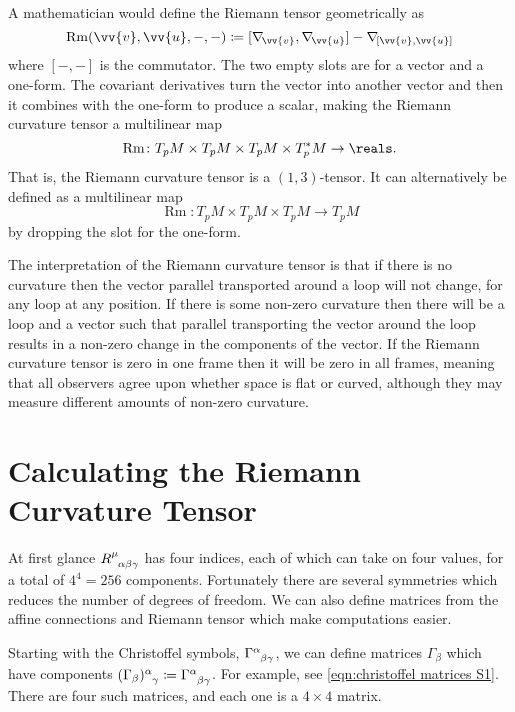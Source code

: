 \documentclass[fleqn]{NotesClass}
\newcommand*{\christoffel}[3]{\tensor{\Gamma}{^{#1}_{{#2}{#3}}}}
\newcommand*{\covariantDerivative}[1]{\nabla_{\!#1}}
\begin{document}
    A mathematician would define the Riemann tensor geometrically as
    \begin{equation}
        \mathop{\mathrm{Rm}}(\vv{v}, \vv{u}, -, -) \coloneqq [\covariantDerivative{\vv{v}}, \covariantDerivative{\vv{u}}] - \covariantDerivative{[\vv{v}, \vv{u}]}
    \end{equation}
    where \([-,-]\) is the commutator.
    The two empty slots are for a vector and a one-form.
    The covariant derivatives turn the vector into another vector and then it combines with the one-form to produce a scalar, making the Riemann curvature tensor a multilinear map
    \begin{equation}
        \mathop{\mathrm{Rm}}\colon T_pM \times T_pM \times T_pM \times T^*_pM \to \reals.
    \end{equation}
    That is, the Riemann curvature tensor is a \((1, 3)\)-tensor.
    It can alternatively be defined as a multilinear map
    \begin{equation}
        \mathop{\mathrm{Rm}}\colon T_pM \times T_pM \times T_pM \to T_pM
    \end{equation}
    by dropping the slot for the one-form.
    
    The interpretation of the Riemann curvature tensor is that if there is no curvature then the vector parallel transported around a loop will not change, for any loop at any position.
    If there is some non-zero curvature then there will be a loop and a vector such that parallel transporting the vector around the loop results in a non-zero change in the components of the vector.
    If the Riemann curvature tensor is zero in one frame then it will be zero in all frames, meaning that all observers agree upon whether space is flat or curved, although they may measure different amounts of non-zero curvature.
    
    \section{Calculating the Riemann Curvature Tensor}
    At first glance \(\tensor{R}{^\mu_{\alpha\beta\gamma}}\) has four indices, each of which can take on four values, for a total of \(4^4 = 256\) components.
    Fortunately there are several symmetries which reduces the number of degrees of freedom.
    We can also define matrices from the affine connections and Riemann tensor which make computations easier.
    
    Starting with the Christoffel symbols, \(\christoffel{\alpha}{\beta}{\gamma}\), we can define matrices \(\Gamma_\beta\) which have components \(\tensor{(\Gamma_\beta)}{^\alpha_\gamma} \coloneqq \christoffel{\alpha}{\beta}{\gamma}\).
    For example, see \cref{eqn:christoffel matrices S1}.
    There are four such matrices, and each one is a \(4 \times 4\) matrix.
    
\end{document}
